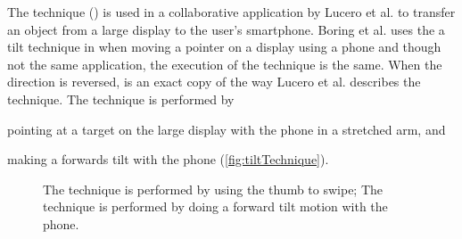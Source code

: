 The \tilt technique () is used in a collaborative application by Lucero et al. \cite{Lucero:2012} to transfer an object from a large display to the user's smartphone.
Boring et al. uses the a tilt technique in \cite{Boring:2009} when moving a pointer on a display using a phone and though not the same application, the execution of the technique is the same.
When the direction is reversed, \tilt is an exact copy of the way Lucero et al. describes the technique.
The \tilt technique is performed by 
\begin{enumerate*}[label=\itshape\roman*\upshape)]
	\item{pointing at a target on the large display with the phone in a stretched arm, and}
	\item{making a forwards tilt with the phone (\cref{fig:tiltTechnique}).}
\end{enumerate*}

\begin{figure}
\caption{
	\protect{} The \swipe technique is performed by using the thumb to swipe;
	\protect{} The \tilt technique is performed by doing a forward tilt motion with the phone.
}
\label{fig:swipeTilt}
\end{figure}


